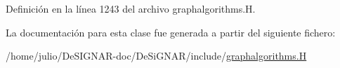Definición en la línea 1243 del archivo graphalgorithms.\+H.



La documentación para esta clase fue generada a partir del siguiente fichero\+:\begin{DoxyCompactItemize}
\item 
/home/julio/\+De\+S\+I\+G\+N\+A\+R-\/doc/\+De\+Si\+G\+N\+A\+R/include/\hyperlink{graphalgorithms_8_h}{graphalgorithms.\+H}\end{DoxyCompactItemize}
